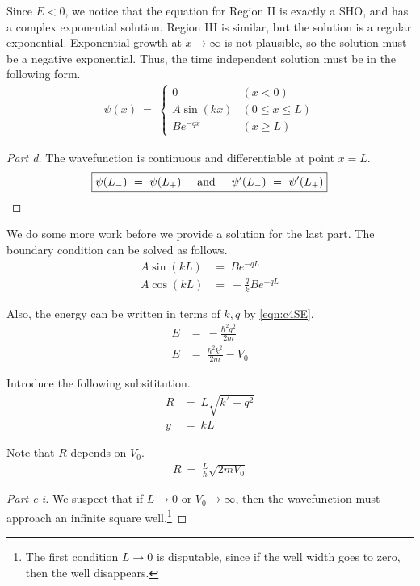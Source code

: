 \documentclass{article}
\numberwithin{equation}{section}
\newcommand{\textAnd}{
    {
        \hspace{5mm}
        \textrm{and}
        \hspace{5mm}
    }
}
\begin{document}
    Since $E < 0$, we notice that the equation for Region II is 
    exactly a SHO, and has a complex exponential solution. Region III 
    is similar, but the solution is a regular exponential. Exponential 
    growth at $x \rightarrow \infty$ is not plausible, so the solution 
    must be a negative exponential. Thus, the time independent 
    solution must be in the following form. 
    \begin{align}
        \psi(x) \ = \ \begin{cases}
            0 & (x < 0) \\ 
            A \sin(kx) & (0 \leq x \leq L) \\ 
            B e^{-qx} & (x \geq L)
        \end{cases}
    \end{align}
    
\begin{proof}
    [Part d]
    The wavefunction is continuous and differentiable at point $x = L$. 
    \begin{align}\boxed{
        \psi(L_-) \ = \ \psi(L_+) 
        \textAnd 
        \psi'(L_-) \ = \ \psi'(L_+)
    }
    \end{align}
\end{proof}

We do some more work before we provide a solution for the last part. 
The boundary condition can be solved as follows. 
\begin{align}\label{eqn:c4bdry}
    A \sin(kL) & = \ B e^{-qL} \\ 
    A \cos(kL) & = \ -\frac q k B e^{-qL}
\end{align}

Also, the energy can be written in terms of $k, q$ by \eqref{eqn:c4SE}. 
\begin{align}
    E & = \ -\frac{\hbar^2 q^2} {2m} \\\label{eqn:c4energies}
    E & = \ \frac{\hbar^2 k^2}{2m} - V_0
\end{align}

Introduce the following subsititution. 
\begin{align}
    R & = \ L \sqrt{k^2 + q^2} \\ 
    y & = \ kL
\end{align}

Note that $R$ depends on $V_0$. 
\begin{align}
    R \ = \ \frac L \hbar \sqrt{2m V_0}
\end{align}

\begin{proof}
    [Part e-i]
    We suspect that if $L\rightarrow 0$ or $V_0 \rightarrow \infty$, 
    then the wavefunction must approach an infinite square well.\footnote{
        The first condition $L \rightarrow 0$ is disputable, since 
        if the well width goes to zero, then the well disappears. 
    }
\end{proof}
\end{document}
